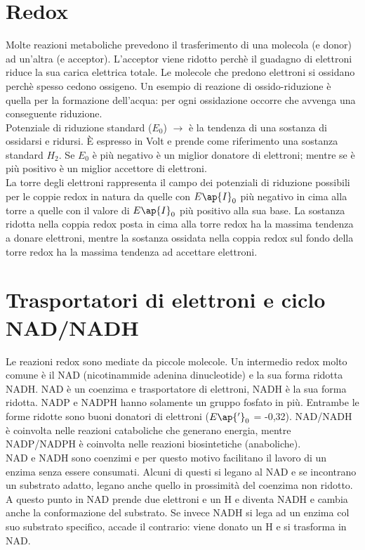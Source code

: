 \section{Redox}
Molte reazioni metaboliche prevedono il trasferimento di una molecola (e\ap{-} donor) ad un'altra (e\ap{-} acceptor). L'acceptor viene ridotto perch\`e il guadagno di elettroni riduce la sua carica elettrica totale. Le molecole che predono elettroni si ossidano perch\`e spesso cedono ossigeno. Un esempio di reazione di ossido-riduzione \`e quella per la formazione dell'acqua: per ogni ossidazione occorre che avvenga una conseguente riduzione.
\\Potenziale di riduzione standard ($E_0$) $\xrightarrow{}$ \`e la tendenza di una sostanza di ossidarsi e ridursi. \`E espresso in Volt e prende come riferimento una sostanza standard $H_2$. Se $E_0$ \`e pi\`u negativo è un miglior donatore di elettroni; mentre se \`e pi\`u positivo \`e un miglior accettore di elettroni.
\\La torre degli elettroni rappresenta il campo dei potenziali di riduzione possibili per le coppie redox in natura da quelle con $E\ap{I}_0$ pi\`u negativo in cima alla torre  a quelle con il valore di $E\ap{I}_0$ pi\`u positivo alla sua base. La sostanza ridotta nella coppia redox posta in cima alla torre redox ha la massima tendenza a donare elettroni, mentre la sostanza ossidata nella coppia redox sul fondo della torre redox ha la massima tendenza ad accettare elettroni. 
\section{Trasportatori di elettroni e ciclo NAD/NADH}
Le reazioni redox sono mediate da piccole molecole. Un intermedio redox molto comune \`e il NAD\ap{+} (nicotinammide adenina dinucleotide) e la sua forma ridotta NADH. NAD\ap{+} \`e un coenzima e trasportatore di elettroni, NADH \`e la sua forma ridotta. NADP\ap{+} e NADPH hanno solamente un gruppo fosfato in pi\`u. Entrambe le forme ridotte sono buoni donatori di elettroni ($E\ap{'}_0$ = -0,32). NAD\ap{+}/NADH \`e coinvolta nelle reazioni cataboliche che generano energia, mentre NADP\ap{+}/NADPH \`e coinvolta nelle reazioni biosintetiche (anaboliche).
\\NAD\ap{+} e NADH sono coenzimi e per questo motivo facilitano il lavoro di un enzima senza essere consumati. Alcuni di questi si legano al NAD\ap{+} e se incontrano un substrato adatto, legano anche quello in prossimit\`a del coenzima non ridotto. A questo punto in NAD prende due elettroni e un H\ap{+} e diventa NADH e cambia anche la conformazione del substrato. Se invece NADH si lega ad un enzima col suo substrato specifico, accade il contrario: viene donato un H\ap{+} e si trasforma in NAD\ap{+}.
